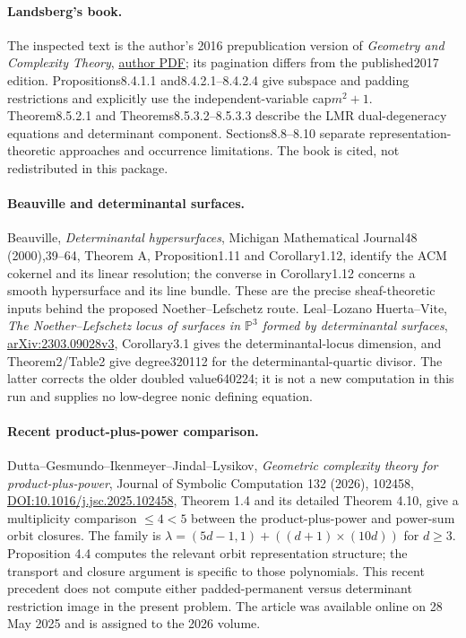 \paragraph{Landsberg's book.}
The inspected text is the author's 2016 prepublication version of
\emph{Geometry and Complexity Theory},
\href{https://people.tamu.edu/~jml/simonsclass.pdf}{author PDF};
its pagination differs from the published2017 edition.
Propositions8.4.1.1 and8.4.2.1--8.4.2.4 give subspace and padding
restrictions and explicitly use the independent-variable cap$m^2+1$.
Theorem8.5.2.1 and Theorems8.5.3.2--8.5.3.3 describe the LMR
dual-degeneracy equations and determinant component. Sections8.8--8.10
separate representation-theoretic approaches and occurrence limitations.
The book is cited, not redistributed in this package.

\paragraph{Beauville and determinantal surfaces.}
Beauville, \emph{Determinantal hypersurfaces}, Michigan Mathematical
Journal48 (2000),39--64, Theorem A, Proposition1.11 and Corollary1.12,
identify the ACM cokernel and its linear resolution; the converse in
Corollary1.12 concerns a smooth hypersurface and its line bundle.
These are the precise sheaf-theoretic inputs behind the proposed
Noether--Lefschetz route. Leal--Lozano Huerta--Vite,
\emph{The Noether--Lefschetz locus of surfaces in $\mathbb P^3$
formed by determinantal surfaces},
\href{https://arxiv.org/abs/2303.09028}{arXiv:2303.09028v3},
Corollary3.1 gives the determinantal-locus dimension, and Theorem2/Table2
give degree320112 for the determinantal-quartic divisor. The latter
corrects the older doubled value640224; it is not a new computation in
this run and supplies no low-degree nonic defining equation.

\paragraph{Recent product-plus-power comparison.}
Dutta--Gesmundo--Ikenmeyer--Jindal--Lysikov,
\emph{Geometric complexity theory for product-plus-power}, Journal of
Symbolic Computation 132 (2026), 102458,
\href{https://doi.org/10.1016/j.jsc.2025.102458}{DOI:10.1016/j.jsc.2025.102458},
Theorem 1.4 and its detailed Theorem 4.10, give a multiplicity comparison
$\le4<5$ between the product-plus-power and power-sum orbit closures.
The family is $\lambda=(5d-1,1)+((d+1)\times(10d))$ for $d\ge3$.
Proposition 4.4 computes the relevant orbit representation structure;
the transport and closure argument is specific to those polynomials.
This recent precedent does not compute either padded-permanent versus
determinant restriction image in the present problem. The article was
available online on 28 May 2025 and is assigned to the 2026 volume.

